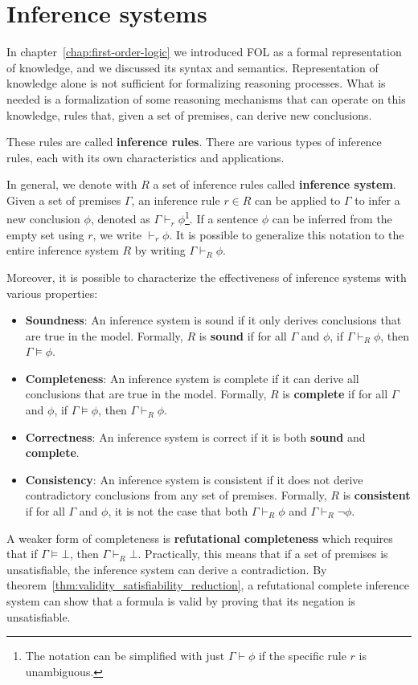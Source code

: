 \chapter{Inference systems}\label{chap:inference-systems}

In chapter~\ref{chap:first-order-logic} we introduced FOL as a formal representation of knowledge, and we discussed its syntax and semantics.
Representation of knowledge alone is not sufficient for formalizing reasoning processes.
What is needed is a formalization of some reasoning mechanisms that can operate on this knowledge, rules that, given a set of premises, can derive new conclusions.

These rules are called \textbf{inference rules}.
There are various types of inference rules, each with its own characteristics and applications.

In general, we denote with \(R\) a set of inference rules called \textbf{inference system}. Given a set of premises \(\Gamma\), an inference rule \(r \in R\) can be applied to \(\Gamma\) to infer a new conclusion \(\phi\), denoted as \(\Gamma \vdash_r \phi\)\footnote{
  The notation can be simplified with just \(\Gamma \vdash \phi\) if the specific rule \(r\) is unambiguous.}.
If a sentence \(\phi\) can be inferred from the empty set using \(r\), we write \(\vdash_r \phi\).
It is possible to generalize this notation to the entire inference system \(R\) by writing \(\Gamma \vdash_{R} \phi\).

Moreover, it is possible to characterize the effectiveness of inference systems with various properties:

\begin{itemize}
    \item \textbf{Soundness}: An inference system is sound if it only derives conclusions that are true in the model. Formally, \(R\) is \textbf{sound} if for all \(\Gamma\) and \(\phi\), if \(\Gamma \vdash_{R} \phi\), then \(\Gamma\models\phi\).
    \item \textbf{Completeness}: An inference system is complete if it can derive all conclusions that are true in the model. Formally, \(R\) is \textbf{complete} if for all \(\Gamma\) and \(\phi\), if \(\Gamma\models\phi\), then \(\Gamma \vdash_{R} \phi\).
    \item \textbf{Correctness}: An inference system is correct if it is both \textbf{sound} and \textbf{complete}.
    \item \textbf{Consistency}: An inference system is consistent if it does not derive contradictory conclusions from any set of premises. Formally, \(R\) is \textbf{consistent} if for all \(\Gamma\) and \(\phi\), it is not the case that both \(\Gamma \vdash_{R} \phi\) and \(\Gamma \vdash_{R} \neg \phi\).
\end{itemize}
A weaker form of completeness is \textbf{refutational completeness} which requires that if \(\Gamma \models \bot\), then \(\Gamma \vdash_{R} \bot\).  Practically, this means that if a set of premises is unsatisfiable, the inference system can derive a contradiction.
By theorem~\ref{thm:validity_satisfiability_reduction}, a refutational complete inference system can show that a formula is valid by proving that its negation is unsatisfiable.

